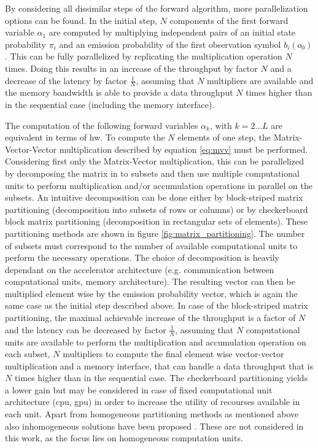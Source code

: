 \documentclass[mscthesis]{usiinfthesis}
\begin{document}
By considering all dissimilar steps of the forward algorithm, more
parallelization options can be found. In the initial step, $N$ components of
the first forward variable $\alpha_1$ are computed by multiplying independent
pairs of an initial state probability $\pi_i$ and an emission probability of
the first observation symbol $b_i(o_0)$. This can be fully parallelized by
replicating the multiplication operation $N$ times. Doing this results in an
increase of the throughput by factor $N$ and a decrease of the latency by
factor $\frac{1}{N}$, assuming that $N$ multipliers are available and the
memory bandwidth is able to provide a data throughput $N$ times higher than in
the sequential case (including the memory interface).

The computation of the following forward variables $\alpha_k$, with $k
= 2 \dots L$ are equivalent in terms of \gls{hw}. To compute the $N$ elements
of one step, the Matrix-Vector-Vector multiplication described by equation
\ref{eq:mvv} must be performed. Considering first only the Matrix-Vector
multiplication, this can be parallelized by decomposing the matrix in to
subsets and then use multiple computational units to perform multiplication
and/or accumulation operations in parallel on the subsets. An intuitive
decomposition can be done either by block-striped matrix partitioning
(decomposition into subsets of rows or columns) or by checkerboard block matrix
partitioning (decomposition in rectangular sets of elements). These
partitioning methods are shown in figure \ref{fig:matrix_partitioning}. The
number of subsets must correspond to the number of available computational
units to perform the necessary operations. The choice of decomposition is
heavily dependant on the accelerator architecture (e.g. communication between
computational units, memory architecture). The resulting vector can then be
multiplied element wise by the emission probability vector, which is again the
same case as the initial step described above. In case of the block-striped
matrix partitioning, the maximal achievable increase of the throughput is
a factor of $N$ and the latency can be decreased by factor $\frac{1}{N}$,
assuming that $N$ computational units are available to perform the
multiplication and accumulation operation on each subset, $N$ multipliers to
compute the final element wise vector-vector multiplication and a memory
interface, that can handle a data throughput that is $N$ times higher than in
the sequential case. The checkerboard partitioning yields a lower gain but may
be considered in case of fixed computational unit architecture (\gls{cpu},
\gls{gpu}) in order to increase the utility of recourses available in each
unit. Apart from homogeneous partitioning methods as mentioned above also
inhomogeneous solutions have been proposed \cite{IPDPSW12_DeFlumere, clarke11}.
These are not considered in this work, as the focus lies on homogeneous
computation units.
\end{document}
